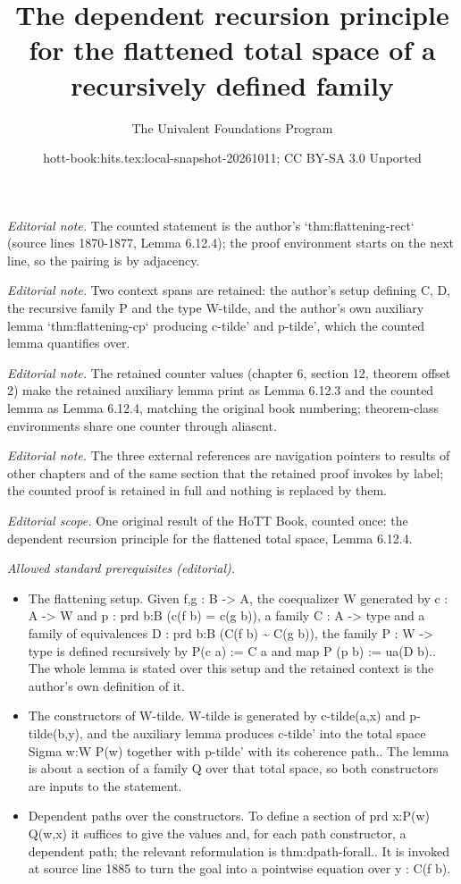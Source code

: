 \documentclass[10pt,a4paper]{article}
\title{The dependent recursion principle for the flattened total space of a recursively defined family}
\author{The Univalent Foundations Program}
\date{hott-book:hits.tex:local-snapshot-20261011; CC BY-SA 3.0 Unported}
\newcounter{chapter}
\theoremstyle{definition}
\theoremstyle{remark}
\numberwithin{equation}{section}
\begin{document}
\maketitle
\setcounter{chapter}{6}
\setcounter{section}{12}
\setcounter{thm}{2}
\noindent\textit{Editorial note.} The counted statement is the author's `thm:flattening-rect` (source lines 1870-1877, Lemma 6.12.4); the proof environment starts on the next line, so the pairing is by adjacency.\par\medskip
\noindent\textit{Editorial note.} Two context spans are retained: the author's setup defining C, D, the recursive family P and the type W-tilde, and the author's own auxiliary lemma `thm:flattening-cp` producing c-tilde' and p-tilde', which the counted lemma quantifies over.\par\medskip
\noindent\textit{Editorial note.} The retained counter values (chapter 6, section 12, theorem offset 2) make the retained auxiliary lemma print as Lemma 6.12.3 and the counted lemma as Lemma 6.12.4, matching the original book numbering; theorem-class environments share one counter through aliascnt.\par\medskip
\noindent\textit{Editorial note.} The three external references are navigation pointers to results of other chapters and of the same section that the retained proof invokes by label; the counted proof is retained in full and nothing is replaced by them.\par\medskip
\noindent\textit{Editorial scope.} One original result of the HoTT Book, counted once: the dependent recursion principle for the flattened total space, Lemma 6.12.4.\par\medskip
\noindent\textit{Allowed standard prerequisites (editorial).}\begin{itemize}
\item The flattening setup. Given f,g : B -> A, the coequalizer W generated by c : A -> W and p : prd b:B (c(f b) = c(g b)), a family C : A -> type and a family of equivalences D : prd b:B (C(f b) \textasciitilde{} C(g b)), the family P : W -> type is defined recursively by P(c a) := C a and map P (p b) := ua(D b).. The whole lemma is stated over this setup and the retained context is the author's own definition of it.
\item The constructors of W-tilde. W-tilde is generated by c-tilde(a,x) and p-tilde(b,y), and the auxiliary lemma produces c-tilde' into the total space Sigma w:W P(w) together with p-tilde' with its coherence path.. The lemma is about a section of a family Q over that total space, so both constructors are inputs to the statement.
\item Dependent paths over the constructors. To define a section of prd x:P(w) Q(w,x) it suffices to give the values and, for each path constructor, a dependent path; the relevant reformulation is thm:dpath-forall.. It is invoked at source line 1885 to turn the goal into a pointwise equation over y : C(f b).
\end{itemize}\medskip
\end{document}
